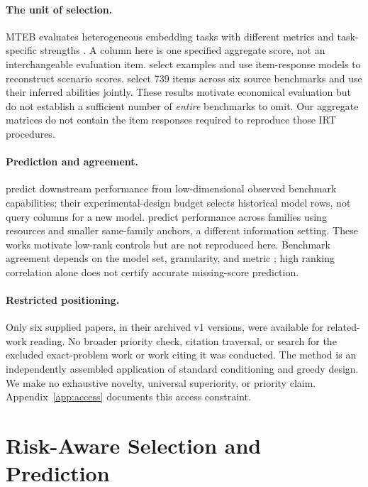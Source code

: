 \documentclass{article}
\begin{document}
\paragraph{The unit of selection.}
MTEB evaluates heterogeneous embedding tasks with different metrics and task-specific strengths \citep{muennighoff2022mteb}. A column here is one specified aggregate score, not an interchangeable evaluation item. \citet{polo2024tinybenchmarks} select examples and use item-response models to reconstruct scenario scores. \citet{kipnis2024metabench} select 739 items across six source benchmarks and use their inferred abilities jointly. These results motivate economical evaluation but do not establish a sufficient number of \emph{entire} benchmarks to omit. Our aggregate matrices do not contain the item responses required to reproduce those IRT procedures.

\paragraph{Prediction and agreement.}
\citet{ruan2024observationalscaling} predict downstream performance from low-dimensional observed benchmark capabilities; their experimental-design budget selects historical model rows, not query columns for a new model. \citet{polo2024sloth} predict performance across families using resources and smaller same-family anchors, a different information setting. These works motivate low-rank controls but are not reproduced here. Benchmark agreement depends on the model set, granularity, and metric \citep{perlitz2024benchbench}; high ranking correlation alone does not certify accurate missing-score prediction.

\paragraph{Restricted positioning.}
Only six supplied papers, in their archived v1 versions, were available for related-work reading. No broader priority check, citation traversal, or search for the excluded exact-problem work or work citing it was conducted. The method is an independently assembled application of standard conditioning and greedy design. We make no exhaustive novelty, universal superiority, or priority claim. Appendix~\ref{app:access} documents this access constraint.

\section{Risk-Aware Selection and Prediction}
\label{sec:method}
\end{document}
